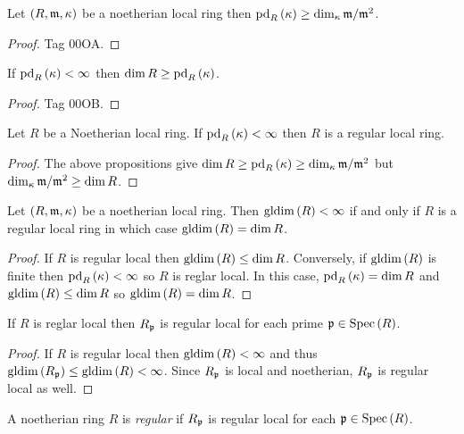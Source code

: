 \documentclass[12pt]{article}
\begin{document}
\begin{prop}
Let $(R, \mathfrak{m}, \kappa)$ be a noetherian local ring then $\mathrm{pd}_{R} \left( \kappa \right) \ge \dim_\kappa \mathfrak{m} / \mathfrak{m}^2$.
\end{prop}

\begin{proof}
Tag 00OA.
\end{proof}

\begin{prop}
If $\mathrm{pd}_{R} \left( \kappa \right) < \infty$ then $\dim{R} \ge \mathrm{pd}_{R} \left( \kappa \right)$.
\end{prop}

\begin{proof}
Tag 00OB.
\end{proof}

\begin{prop}
Let $R$ be a Noetherian local ring. If $\mathrm{pd}_{R} \left( \kappa \right) < \infty$ then $R$ is a regular local ring.
\end{prop}

\begin{proof}
The above propositions give $\dim{R} \ge \mathrm{pd}_{R} \left( \kappa \right) \ge \dim_\kappa \mathfrak{m} / \mathfrak{m}^2$ but $\dim_\kappa \mathfrak{m} / \mathfrak{m}^2 \ge \dim{R}$.
\end{proof}

\begin{prop}
Let $(R, \mathfrak{m}, \kappa)$ be a noetherian local ring. Then $\mathrm{gldim}\left( R \right) < \infty$ if and only if $R$ is a regular local ring in which case $\mathrm{gldim}\left( R \right) = \dim{R}$.
\end{prop}

\begin{proof}
If $R$ is regular local then $\mathrm{gldim}\left( R \right) \le \dim{R}$. Conversely, if $\mathrm{gldim}\left( R \right)$ is finite then $\mathrm{pd}_{R} \left( \kappa \right) < \infty$ so $R$ is reglar local. In this case, $\mathrm{pd}_{R} \left( \kappa \right) = \dim{R}$ and $\mathrm{gldim}\left( R \right) \le \dim{R}$ so $\mathrm{gldim}\left( R \right) = \dim{R}$.
\end{proof}

\begin{lemma}
If $R$ is reglar local then $R_{\mathfrak{p}}$ is regular local for each prime $\mathfrak{p} \in \mathrm{Spec}\left( R \right)$.
\end{lemma}

\begin{proof}
If $R$ is regular local then $\mathrm{gldim}\left( R \right) < \infty$ and thus $\mathrm{gldim}\left( R_{\mathfrak{p}} \right) \le \mathrm{gldim}\left( R \right) < \infty$. Since $R_{\mathfrak{p}}$ is local and noetherian, $R_{\mathfrak{p}}$ is regular local as well.
\end{proof}

\begin{defn}
A noetherian ring $R$ is \textit{regular} if $R_{\mathfrak{p}}$ is regular local for each $\mathfrak{p} \in \mathrm{Spec}\left( R \right)$.
\end{defn}
\end{document}
